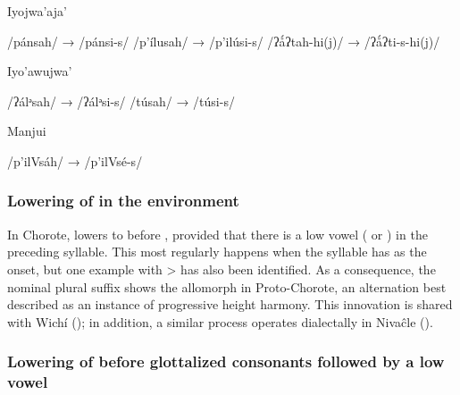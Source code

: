 \ea
    Iyojwa’aja’ \citep[96, 143, 144]{ND09}
    \begin{xlist}
        \ex {} /pánsah/ →  /pánsi-s/
        \ex {} /p’ílusah/ →  /p’ilúsi-s/
        \ex {} /ʔǻʔtah-hi(j)/ →  /ʔǻʔti-s-hi(j)/
    \end{xlist}
\z
\ea
        Iyo’awujwa’ \citep[120, 166]{AG83}
    \begin{xlist}
        \ex {} /ʔálᵊsah/ →  /ʔálᵊsi-s/
        \ex {} /túsah/ →  /túsi-s/
    \end{xlist}
\z
\ea
        Manjui \citep{JC18}
    \begin{xlist}
        \ex {} /p’ilVsáh/ →  /p’ilVsé-s/
    \end{xlist}
\z
{}

\subsubsection{Lowering of  in the environment }\label{pm-ch-atits-ates}

In Chorote,  lowers to  before , provided that there is a low vowel ( or ) in the preceding syllable. This most regularly happens when the syllable has  as the onset, but one example with  >  has also been identified. As a consequence, the nominal plural suffix  shows the allomorph  in Proto-Chorote, an alternation best described as an instance of progressive height harmony. This innovation is shared with Wichí (); in addition, a similar process operates dialectally in Nivaĉle ().

\begin{exe}
    \ex \drinknpl
    \ex \waterpl
    \ex \starn
    \ex \earthpl
    \ex \skinpl
\end{exe}

\subsubsection{Lowering of  before glottalized consonants followed by a low vowel}\label{pm-ch-ji-a}

